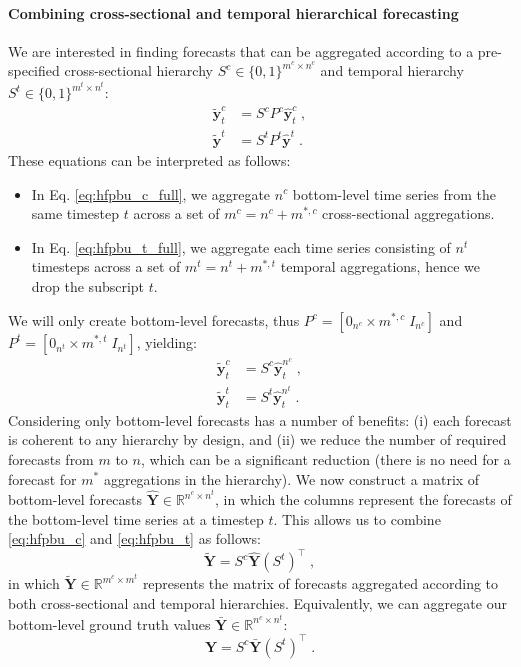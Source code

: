 \documentclass[preprint, 3p, times, twocolumn]{elsarticle}
\begin{document}
\paragraph{Combining cross-sectional and temporal hierarchical forecasting} We are interested in finding forecasts that can be aggregated according to a pre-specified cross-sectional hierarchy \(S^c \in \{0, 1\}^{m^c \times n^c}\) and temporal hierarchy \(S^t \in \{0, 1\}^{m^t \times n^t}\):
\begin{align} 
  \tilde{\textbf{y}}^c_{t} &= S^c P^c \hat{\textbf{y}}^c_{t} \;, \label{eq:hfpbu_c_full} \\
  \tilde{\textbf{y}}^t &= S^t P^t \hat{\textbf{y}}^t \;. \label{eq:hfpbu_t_full}
\end{align}
These equations can be interpreted as follows:
\begin{itemize}
  \item In Eq. \eqref{eq:hfpbu_c_full}, we aggregate \(n^c\) bottom-level time series from the same timestep \(t\) across a set of \(m^c = n^c + m^{*, c}\) cross-sectional aggregations.
  \item In Eq. \eqref{eq:hfpbu_t_full}, we aggregate each time series consisting of \(n^t\) timesteps across a set of \(m^t = n^t + m^{*, t}\) temporal aggregations, hence we drop the subscript \(t\).
\end{itemize}
We will only create bottom-level forecasts, thus \(P^c = [0_{n^c} \times m^{*, c} \; I_{n^c}] \) and \(P^t = [0_{n^t} \times m^{*, t} \; I_{n^t}] \), yielding:
\begin{align} 
  \tilde{\textbf{y}}^c_{t} &= S^c \hat{\textbf{y}}^{n^c}_{t} \;, \label{eq:hfpbu_c} \\
  \tilde{\textbf{y}}^t_{t} &= S^t \hat{\textbf{y}}^{n^t}_{t} \;. \label{eq:hfpbu_t}
\end{align}
Considering only bottom-level forecasts has a number of benefits: (i) each forecast is coherent to any hierarchy by design, and (ii) we reduce the number of required forecasts from \(m\) to \(n\), which can be a significant reduction (there is no need for a forecast for \(m^*\) aggregations in the hierarchy). 
We now construct a matrix of bottom-level forecasts \(\hat{\textbf{Y}} \in \mathbb{R}^{n^c \times n^t}\), in which the columns represent the forecasts of the bottom-level time series at a timestep \(t\). This allows us to combine \eqref{eq:hfpbu_c} and \eqref{eq:hfpbu_t} as follows:
\begin{equation}
  \tilde{\textbf{Y}} = S^c \hat{\textbf{Y}} (S^t)^\intercal \;, \label{eq:hfp_tc} 
\end{equation}
in which \(\tilde{\textbf{Y}} \in \mathbb{R}^{m^c \times m^t}\) represents the matrix of forecasts aggregated according to both cross-sectional and temporal hierarchies. Equivalently, we can aggregate our bottom-level ground truth values \(\bar{\textbf{Y}} \in \mathbb{R}^{n^c \times n^t}\):
\begin{equation}
  \textbf{Y} = S^c \bar{\textbf{Y}} (S^t)^\intercal \;. \label{eq:hfp_tc_gt} 
\end{equation}
\end{document}
